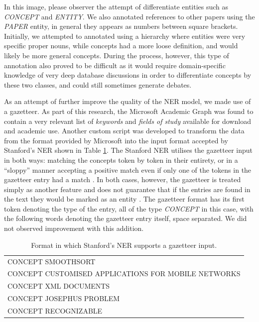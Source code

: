 \documentclass[11pt,a4paper,openright]{memoir}
\begin{document}
In this image, please observer the attempt of differentiate entities such as \emph{CONCEPT} and \emph{ENTITY}. We also annotated references to other papers using the \emph{PAPER} entity, in general they appears as numbers between square brackets. Initially, we attempted to annotated using a hierarchy where entities were very specific proper nouns, while concepts had a more loose definition, and would likely be more general concepts. During the process, however, this type of annotation also proved to be difficult as it would require domain-specific knowledge of very deep database discussions in order to differentiate concepts by these two classes, and could still sometimes generate debates.

As an attempt of further improve the quality of the NER model, we made use of a gazetteer. As part of this research, the Microsoft Academic Graph \cite{microsoft-academic-data} was found to contain a very relevant list of \emph{keywords} and \emph{fields of study} available for download and academic use. Another custom script was developed to transform the data from the format provided by Microsoft into the input format accepted by Stanford's NER shown in Table \ref{tab:concept_list_from_gazetteer}. The Stanford NER utilises the gazetteer input in both ways: matching the concepts token by token in their entirety, or in a \enquote{sloppy} manner accepting a positive match even if only one of the tokens in the gazetteer entry had a match \cite{Finkel:2005:INI:1219840.1219885}. In both cases, however, the gazetteer is treated simply as another feature and does not guarantee that if the entries are found in the text they would be marked as an entity \cite{Finkel:2005:INI:1219840.1219885}. The gazetteer format has its first token denoting the type of the entry, all of the type \emph{CONCEPT} in this case, with the following words denoting the gazetteer entry itself, space separated. We did not observed improvement with this addition.

\begin{table}[!htbp]
  \centering
    \begin{tabular}{l}
CONCEPT SMOOTHSORT \\
CONCEPT CUSTOMISED APPLICATIONS FOR MOBILE NETWORKS \\
CONCEPT XML DOCUMENTS \\
CONCEPT JOSEPHUS PROBLEM \\
CONCEPT RECOGNIZABLE 
    \end{tabular}
  \caption[Format in which Stanford's NER supports a gazetteer input.]{Format in which Stanford's NER supports a gazetteer input.}
  \label{tab:concept_list_from_gazetteer}
\end{table}
\end{document}
